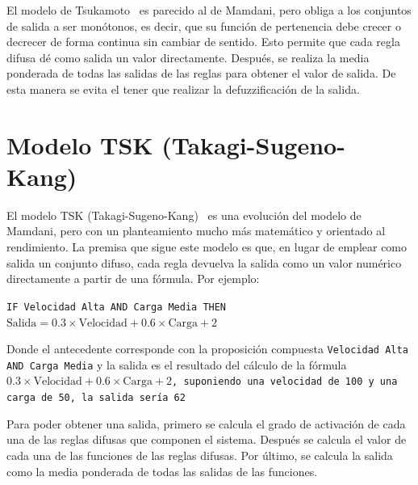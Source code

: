 El modelo de Tsukamoto~\cite{jang1997neurofuzzy} es parecido al de Mamdani, pero obliga a los conjuntos de salida a ser monótonos, es decir, que su función de pertenencia debe crecer o decrecer de forma continua sin cambiar de sentido. Esto permite que cada regla difusa dé como salida un valor directamente. Después, se realiza la media ponderada de todas las salidas de las reglas para obtener el valor de salida. De esta manera se evita el tener que realizar la defuzzificación de la salida.

\section{Modelo TSK (Takagi-Sugeno-Kang)}
\label{apx:ModeloTSK}

El modelo TSK (Takagi-Sugeno-Kang)~\cite{6313399} es una evolución del modelo de Mamdani, pero con un planteamiento mucho más matemático y orientado al rendimiento. La premisa que sigue este modelo es que, en lugar de emplear como salida un conjunto difuso, cada regla devuelva la salida como un valor numérico directamente a partir de una fórmula. Por ejemplo:

\begin{center}
    \texttt{IF Velocidad Alta AND Carga Media THEN \(\text{Salida} = 0.3 \times \text{Velocidad} + 0.6 \times \text{Carga} + 2\)}
\end{center}

Donde el antecedente corresponde con la proposición compuesta \texttt{Velocidad Alta AND Carga Media} y la salida es el resultado del cálculo de la fórmula \texttt{\(0.3 \times \text{Velocidad} + 0.6 \times \text{Carga} + 2\), suponiendo una velocidad de 100 y una carga de 50, la salida sería 62}

Para poder obtener una salida, primero se calcula el grado de activación de cada una de las reglas difusas que componen el sistema. Después se calcula el valor de cada una de las funciones de las reglas difusas. Por último, se calcula la salida como la media ponderada de todas las salidas de las funciones.

